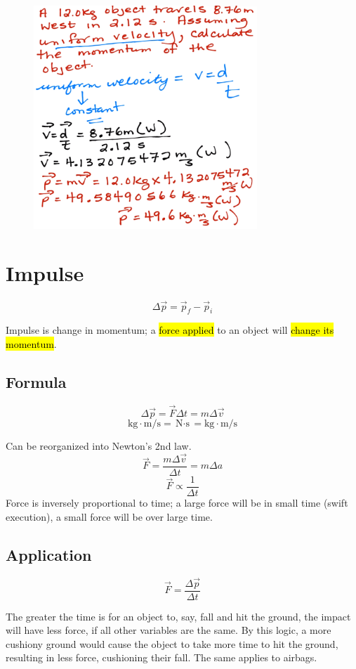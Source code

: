 \documentclass[a4paper,12pt]{article}
\begin{document}
\begin{figure}[H]
    \centering
    \includegraphics[width=0.75\textwidth]{q-mom-3}
\end{figure}

\section{Impulse}
\Large $$\Delta\vec{p} = \vec{p}_f - \vec{p}_i$$ \normalsize

Impulse is change in momentum; a \hl{force applied} to an object will \hl{change its momentum}.

\subsection{Formula}
\Large $$\Delta\vec{p} = \vec{F}\Delta{t} = m\Delta{\vec{v}}$$ \normalsize
$$\si{\kg\cdot\m/\s} = \si{\newton\cdot\s} = \si{\kg\cdot\m/\s}$$

Can be reorganized into Newton's 2nd law.
$$\vec{F} = \frac{m\Delta\vec{v}}{\Delta{t}} = m\Delta{a}$$
$$\vec{F} \propto \frac{1}{\Delta{t}}$$
Force is inversely proportional to time; a large force will be in small time (swift execution), a small force will be over large time.

\subsection{Application}
$$\vec{F} = \frac{\Delta\vec{p}}{\Delta{t}}$$

The greater the time is for an object to, say, fall and hit the ground, the impact will have less force, if all other variables are the same. By this logic, a more cushiony ground would cause the object to take more time to hit the ground, resulting in less force, cushioning their fall. The same applies to airbags.
\end{document}
